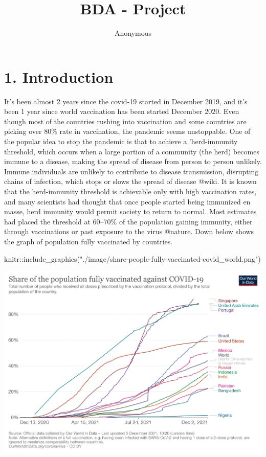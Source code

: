 \documentclass[
]{article}
\title{BDA - Project}
\author{Anonymous}
\date{}
\newenvironment{Shaded}{\begin{snugshade}}{\end{snugshade}}
\newcommand{\FunctionTok}[1]{\textcolor[rgb]{0.00,0.00,0.00}{#1}}
\newcommand{\NormalTok}[1]{#1}
\newcommand{\SpecialCharTok}[1]{\textcolor[rgb]{0.00,0.00,0.00}{#1}}
\newcommand{\StringTok}[1]{\textcolor[rgb]{0.31,0.60,0.02}{#1}}
\begin{document}
\maketitle

{
\hypersetup{linkcolor=}
\setcounter{tocdepth}{1}
\tableofcontents
}
\newpage

\hypertarget{introduction}{%
\section{1. Introduction}\label{introduction}}

It's been almost 2 years since the covid-19 started in December 2019,
and it's been 1 year since world vaccination has been started December
2020. Even though most of the countries rushing into vaccination and
some countries are picking over 80\% rate in vaccination, the pandemic
seems unstoppable. One of the popular idea to stop the pandemic is that
to achieve a 'herd-immunity threshold, which occurs when a large portion
of a community (the herd) becomes immune to a disease, making the spread
of disease from person to person unlikely. Immune individuals are
unlikely to contribute to disease transmission, disrupting chains of
infection, which stops or slows the spread of disease @wiki. It is known
that the herd-immunity threshold is achievable only with high
vaccination rates, and many scientists had thought that once people
started being immunized en masse, herd immunity would permit society to
return to normal. Most estimates had placed the threshold at 60--70\% of
the population gaining immunity, either through vaccinations or past
exposure to the virus @nature. Down below shows the graph of population
fully vaccinated by countries.

\begin{Shaded}
\begin{Highlighting}[]
\NormalTok{knitr}\SpecialCharTok{::}\FunctionTok{include\_graphics}\NormalTok{(}\StringTok{"./image/share{-}people{-}fully{-}vaccinated{-}covid\_world.png"}\NormalTok{)}
\end{Highlighting}
\end{Shaded}

\includegraphics{./image/share-people-fully-vaccinated-covid_world.png}
\end{document}
